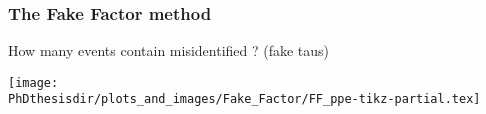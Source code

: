 \begin{frame}
\frametitle{The Fake Factor method}

\manip How many events contain misidentified \tauh? (fake taus)

\pause

\begin{center}
\texttt{[image: \\PhDthesisdir/plots\_and\_images/Fake\_Factor/FF\_ppe-tikz-partial.tex]}
\end{center}
\end{frame}



%
%
%
%
%
%
